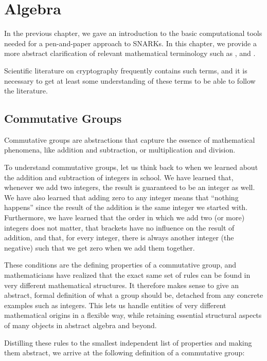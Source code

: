 \chapter{Algebra}\label{chap:algebra}

In the previous chapter, we gave an introduction to the basic computational tools needed for a pen-and-paper approach to SNARKs. In this chapter, we provide a more abstract clarification of relevant mathematical terminology such as ,  and .

Scientific literature on cryptography frequently contains such terms, and it is necessary to get at least some understanding of these terms to be able to follow the literature.

\section{Commutative Groups}
\label{sec:groups}
Commutative groups are abstractions that capture the essence of mathematical phenomena, like addition and subtraction, or multiplication and division.

To understand commutative groups, let us think back to when we learned about the addition and subtraction of integers in school. We have learned that, whenever we add two integers, the result is guaranteed to be an integer as well. We have also learned that adding zero to any integer means that ``nothing happens'' since the result of the addition is the same integer we started with. Furthermore, we have learned that the order in which we add two (or more) integers does not matter, that brackets have no influence on the result of addition, and that, for every integer, there is always another integer (the negative) such that we get zero when we add them together.

These conditions are the defining properties of a commutative group, and mathematicians have realized that the exact same set of rules can be found in very different mathematical structures. It therefore makes sense to give an abstract, formal definition of what a group should be, detached from any concrete examples such as integers. This lets us handle entities of very different mathematical origins in a flexible way, while retaining essential structural aspects of many objects in abstract algebra and beyond.

Distilling these rules to the smallest independent list of properties and making them abstract, we arrive at the following definition of a commutative group:

